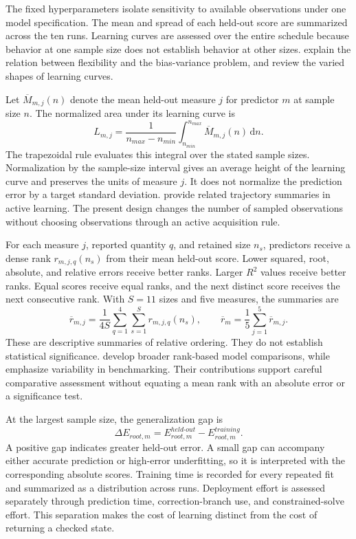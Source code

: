 The fixed hyperparameters isolate sensitivity to available observations under one model specification. The mean and spread of each held-out score are summarized across the ten runs. Learning curves are assessed over the entire schedule because behavior at one sample size does not establish behavior at other sizes. \citet{Geman1992} explain the relation between flexibility and the bias-variance problem, and \citet{VieringLoog2023} review the varied shapes of learning curves.

Let \(\overline M_{m,j}(n)\) denote the mean held-out measure \(j\) for predictor \(m\) at sample size \(n\). The normalized area under its learning curve is
\begin{equation}
\label{eq:icsor_learning_area}
L_{m,j}=\frac{1}{n_{max}-n_{min}}
\int_{n_{min}}^{n_{max}}\overline M_{m,j}(n)\,\mathrm{d}n.
\end{equation}
The trapezoidal rule evaluates this integral over the stated sample sizes. Normalization by the sample-size interval gives an average height of the learning curve and preserves the units of measure \(j\). It does not normalize the prediction error by a target standard deviation. \citet{Cawley2011,Guyon2011} provide related trajectory summaries in active learning. The present design changes the number of sampled observations without choosing observations through an active acquisition rule.

For each measure \(j\), reported quantity \(q\), and retained size \(n_s\), predictors receive a dense rank \(r_{m,j,q}(n_s)\) from their mean held-out score. Lower squared, root, absolute, and relative errors receive better ranks. Larger \(R^2\) values receive better ranks. Equal scores receive equal ranks, and the next distinct score receives the next consecutive rank. With \(S=11\) sizes and five measures, the summaries are
\begin{equation}
\label{eq:icsor_dense_rank}
\overline r_{m,j}=\frac{1}{4S}\sum_{q=1}^{4}\sum_{s=1}^{S}r_{m,j,q}(n_s),
\qquad
\overline r_m=\frac{1}{5}\sum_{j=1}^{5}\overline r_{m,j}.
\end{equation}
These are descriptive summaries of relative ordering. They do not establish statistical significance. \citet{Demsar2006} develop broader rank-based model comparisons, while \citet{Shevchenko2024} emphasize variability in benchmarking. Their contributions support careful comparative assessment without equating a mean rank with an absolute error or a significance test.

At the largest sample size, the generalization gap is
\begin{equation}
\label{eq:icsor_generalization_gap}
\Delta E_{root,m}=E_{root,m}^{held\text{-}out}-E_{root,m}^{training}.
\end{equation}
A positive gap indicates greater held-out error. A small gap can accompany either accurate prediction or high-error underfitting, so it is interpreted with the corresponding absolute scores. Training time is recorded for every repeated fit and summarized as a distribution across runs. Deployment effort is assessed separately through prediction time, correction-branch use, and constrained-solve effort. This separation makes the cost of learning distinct from the cost of returning a checked state.

